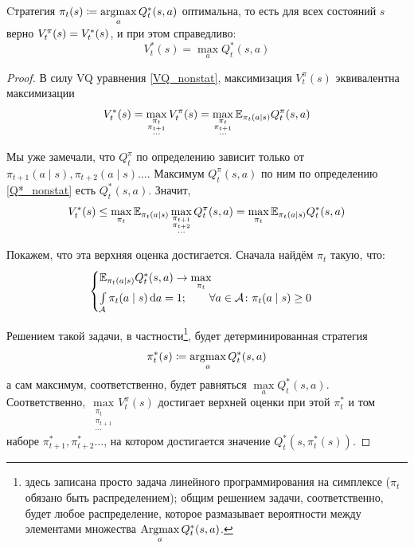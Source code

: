 \begin{theoremBox}[label=th:nonstatbellmancriterion]{}
Cтратегия $\pi_t(s) \coloneqq \mathop{\mathrm{argmax}}\limits_{a} Q^*_t(s, a)$ оптимальна, то есть для всех состояний $s$ верно $V^\pi_t(s) \HM= V^*_t(s)$, и при этом справедливо:
\begin{equation}\label{V*Q*_nonstat}
V^*_t(s) = \max_{a} Q^*_t(s, a)
\end{equation}
\begin{proof}
В силу VQ уравнения \eqref{VQ_nonstat}, максимизация $V^{\pi}_t(s)$ эквивалентна максимизации
$$V^*_t(s) = \max_{\substack{\pi_t \\ \pi_{t+1} \\ \cdots}} V^\pi_t(s) = \max_{\substack{\pi_t \\ \pi_{t+1} \\ \cdots}} \mathbb{E}_{\pi_t(a \mid s)} Q^\pi_t(s, a)$$

Мы уже замечали, что $Q^\pi_t$ по определению зависит только от $\pi_{t+1}(a \mid s), \pi_{t+2}(a \mid s) \dots$. Максимум $Q^\pi_t(s, a)$ по ним по определению \eqref{Q*_nonstat} есть $Q^*_t(s, a)$. Значит,
$$V^*_t(s) \le \max_{\pi_t} \mathbb{E}_{\pi_t(a \mid s)} \max_{\substack{\pi_{t+1} \\ \pi_{t+2} \\ \cdots}} Q^\pi_t(s, a) = \max_{\pi_t} \mathbb{E}_{\pi_t(a \mid s)} Q^*_t(s, a)$$

Покажем, что эта верхняя оценка достигается. Сначала найдём $\pi_t$ такую, что:
$$
\begin{cases}
\mathbb{E}_{\pi_t(a \mid s)} Q^*_t(s, a) \to \max\limits_{\pi_t} \\
\int\limits_{\mathcal{A}} \pi_t(a \mid s) \mathop{}\!\mathrm{d} a = 1; \qquad \forall a \in \mathcal{A} \colon \pi_t(a \mid s) \ge 0
\end{cases}
$$

Решением такой задачи, в частности\footnote[*]{здесь записана просто задача линейного программирования на симплексе ($\pi_t$ обязано быть распределением); общим решением задачи, соответственно, будет любое распределение, которое размазывает вероятности между элементами множества $\mathop{\mathrm{Argmax}}\limits_{a} Q^*_t(s, a)$.}, будет детерминированная стратегия
$$\pi_t^*(s) \coloneqq \mathop{\mathrm{argmax}}_{a} Q^*_t(s, a)$$
а сам максимум, соответственно, будет равняться $\max\limits_{a} Q^*_t(s, a)$. Соответственно, $\max\limits_{\substack{\pi_t \\ \pi_{t+1} \\ \cdots}} V^\pi_t(s)$ достигает верхней оценки при этой $\pi^*_t$ и том наборе $\pi^*_{t+1}, \pi^*_{t+2} \dots$, на котором достигается значение $Q^*_t(s, \pi_t^*(s) )$.
\end{proof}
\end{theoremBox}

